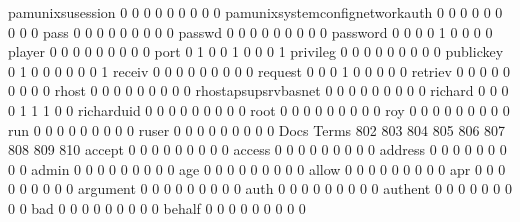 \documentclass[compress,8pt]{beamer}
\begin{document}
\begin{frame}
\begin{Schunk}
  pamunixsusession                           0   0   0   0   0   0   0   0   0
  pamunixsystemconfignetworkauth             0   0   0   0   0   0   0   0   0
  pass                                       0   0   0   0   0   0   0   0   0
  passwd                                     0   0   0   0   0   0   0   0   0
  password                                   0   0   0   0   1   0   0   0   0
  player                                     0   0   0   0   0   0   0   0   0
  port                                       0   1   0   0   1   0   0   0   1
  privileg                                   0   0   0   0   0   0   0   0   0
  publickey                                  0   1   0   0   0   0   0   0   1
  receiv                                     0   0   0   0   0   0   0   0   0
  request                                    0   0   0   1   0   0   0   0   0
  retriev                                    0   0   0   0   0   0   0   0   0
  rhost                                      0   0   0   0   0   0   0   0   0
  rhostapsupsrvbasnet                        0   0   0   0   0   0   0   0   0
  richard                                    0   0   0   0   1   1   1   0   0
  richarduid                                 0   0   0   0   0   0   0   0   0
  root                                       0   0   0   0   0   0   0   0   0
  roy                                        0   0   0   0   0   0   0   0   0
  run                                        0   0   0   0   0   0   0   0   0
  ruser                                      0   0   0   0   0   0   0   0   0
                                          Docs
Terms                                      802 803 804 805 806 807 808 809 810
  accept                                     0   0   0   0   0   0   0   0   0
  access                                     0   0   0   0   0   0   0   0   0
  address                                    0   0   0   0   0   0   0   0   0
  admin                                      0   0   0   0   0   0   0   0   0
  age                                        0   0   0   0   0   0   0   0   0
  allow                                      0   0   0   0   0   0   0   0   0
  apr                                        0   0   0   0   0   0   0   0   0
  argument                                   0   0   0   0   0   0   0   0   0
  auth                                       0   0   0   0   0   0   0   0   0
  authent                                    0   0   0   0   0   0   0   0   0
  bad                                        0   0   0   0   0   0   0   0   0
  behalf                                     0   0   0   0   0   0   0   0   0

\end{Schunk}
\end{frame}
\end{document}
